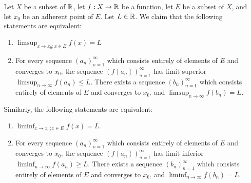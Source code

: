 \begin{ac}\label{ac:9.3.2}
  Let \(X\) be a subset of \(\mathbb{R}\), let \(f : X \to \mathbb{R}\) be a function, let \(E\) be a subset of \(X\), and let \(x_0\) be an adherent point of \(E\).
  Let \(L \in \mathbb{R}\).
  We claim that the following statements are equivalent:
  \begin{enumerate}
    \item \(\limsup_{x \to x_0 ; x \in E} f(x) = L\)
    \item For every sequence \((a_n)_{n = 1}^\infty\) which consists entirely of elements of \(E\) and converges to \(x_0\), the sequence \((f(a_n))_{n = 1}^\infty\) has limit superior \(\limsup_{n \to \infty} f(a_n) \leq L\).
          There exists a sequence \((b_n)_{n = 1}^\infty\) which consists entirely of elements of \(E\) and converges to \(x_0\), and \(\limsup_{n \to \infty} f(b_n) = L\).
  \end{enumerate}
  Similarly, the following statements are equivalent:
  \begin{enumerate}
    \item \(\liminf_{x \to x_0 ; x \in E} f(x) = L\).
    \item For every sequence \((a_n)_{n = 1}^\infty\) which consists entirely of elements of \(E\) and converges to \(x_0\), the sequence \((f(a_n))_{n = 1}^\infty\) has limit inferior \(\liminf_{n \to \infty} f(a_n) \geq L\).
          There exists a sequence \((b_n)_{n = 1}^\infty\) which consists entirely of elements of \(E\) and converges to \(x_0\), and \(\liminf_{n \to \infty} f(b_n) = L\).
  \end{enumerate}
\end{ac}

